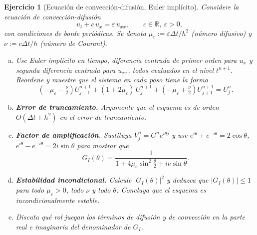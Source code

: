 \documentclass[12pt]{article}
\newtheorem{exercise}{Ejercicio}
\def\dt{\Delta t}
\begin{document}
\begin{exercise}[Ecuación de convección-difusión, Euler implícito]
Considere la ecuación de convección-difusión
\[
  u_t + c\,u_x = \varepsilon\,u_{xx},\qquad c\in\mathbb{R},\ \varepsilon>0,
\]
con condiciones de borde periódicas. Se denota $\mu_\varepsilon:=\varepsilon\dt/h^2$ (número difusivo) y $\nu:=c\dt/h$ (número de Courant).
\begin{enumerate}[(a)]
\item Use Euler implícito en tiempo, diferencia centrada de primer orden para $u_x$ y segunda diferencia centrada para $u_{xx}$, todos evaluados en el nivel $t^{n+1}$. Reordene y muestre que el sistema en cada paso tiene la forma
\[
  \left(-\mu_\varepsilon - \tfrac{\nu}{2}\right)U_{j-1}^{n+1}
  + (1+2\mu_\varepsilon)\,U_j^{n+1}
  + \left(-\mu_\varepsilon + \tfrac{\nu}{2}\right)U_{j+1}^{n+1}
  = U_j^n.
\]

\item \textbf{Error de truncamiento.} Argumente que el esquema es de orden $O(\dt + h^2)$ en el error de truncamiento.

\item \textbf{Factor de amplificación.} Sustituya $V_j^n = G^n e^{i\theta j}$ y use $e^{i\theta}+e^{-i\theta}=2\cos\theta$, $e^{i\theta}-e^{-i\theta}=2i\sin\theta$ para mostrar que
\[
  G_I(\theta) = \frac{1}{1 + 4\mu_\varepsilon\sin^2\!\tfrac{\theta}{2} + i\nu\sin\theta}.
\]

\item \textbf{Estabilidad incondicional.} Calcule $|G_I(\theta)|^2$ y deduzca que $|G_I(\theta)|\le 1$ para todo $\mu_\varepsilon>0$, todo $\nu$ y todo $\theta$. Concluya que el esquema es incondicionalmente estable.

\item Discuta qué rol juegan los términos de difusión y de convección en la parte real e imaginaria del denominador de $G_I$.
\end{enumerate}
\end{exercise}
\end{document}
